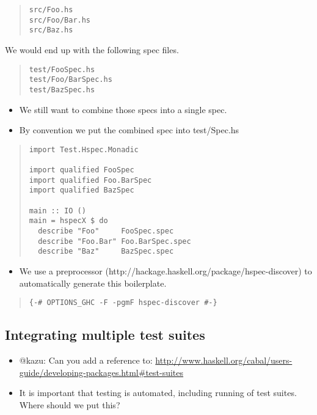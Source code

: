 \documentclass[preprint]{sigplanconf}
\begin{document}
\begin{quote}
\small
\begin{verbatim}
src/Foo.hs
src/Foo/Bar.hs
src/Baz.hs
\end{verbatim}
\end{quote}

\noindent We would end up with the following spec files.

\begin{quote}
\small
\begin{verbatim}
test/FooSpec.hs
test/Foo/BarSpec.hs
test/BazSpec.hs
\end{verbatim}
\end{quote}

\begin{itemize}
\item We still want to combine those specs into a single spec.
\item By convention we put the combined spec into test/Spec.hs
\end{itemize}

\begin{quote}
\small
\begin{verbatim}
import Test.Hspec.Monadic

import qualified FooSpec
import qualified Foo.BarSpec
import qualified BazSpec

main :: IO ()
main = hspecX $ do
  describe "Foo"     FooSpec.spec
  describe "Foo.Bar" Foo.BarSpec.spec
  describe "Baz"     BazSpec.spec
\end{verbatim}
\end{quote}

\begin{itemize}
\item We use a preprocessor (http://hackage.haskell.org/package/hspec-discover) to automatically generate this boilerplate.
\end{itemize}

\begin{quote}
\small
\begin{verbatim}
{-# OPTIONS_GHC -F -pgmF hspec-discover #-}
\end{verbatim}
\end{quote}

\subsection{Integrating multiple test suites}

\begin{itemize}

\item @kazu: Can you add a reference to:
\url{http://www.haskell.org/cabal/users-guide/developing-packages.html#test-suites}

\item It is important that testing is automated, including running of test
    suites.  Where should we put this?
\end{itemize}
\end{document}
